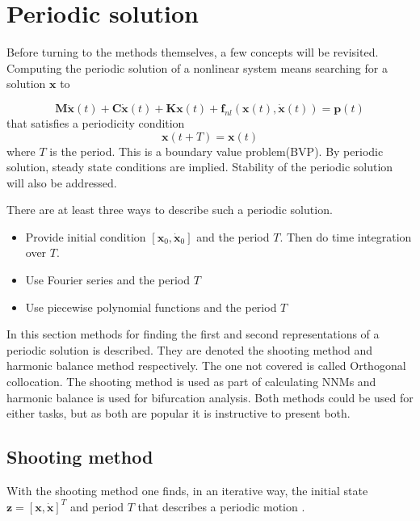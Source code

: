 

\section{Periodic solution}
\label{sec:periodic-solution}

Before turning to the methods themselves, a few concepts will be revisited.
Computing the periodic solution of a nonlinear system means searching for a
solution $\bm x$ to

\begin{equation}
    \label{eq:per_eom}
  \bm M \ddot{\bm x}(t) + \bm C \dot{\bm x}(t) + \bm K \bm x(t) +
  \bm f_{nl} \left( \bm x(t), \dot{ \bm x}(t) \right) = \bm p (t)
\end{equation}
that satisfies a periodicity condition
\begin{equation}
  \label{eq:per_condtion}
  \bm x(t+T) = \bm x(t)
\end{equation}
where $T$ is the period. This is a boundary value problem(BVP). By periodic
solution, steady state conditions are implied. Stability of the periodic
solution will also be addressed.


There are at least three ways to describe such a periodic solution.

\begin{itemize}
\item Provide initial condition $\left[\bm x_0, \dot{\bm x}_0 \right]$ and the
  period $T$. Then do time integration over $T$.
\item Use Fourier series and the period $T$
\item Use piecewise polynomial functions and the period $T$
\end{itemize}

In this section methods for finding the first and second representations of a
periodic solution is described. They are denoted the shooting method and
harmonic balance method respectively. The one not covered is called
Orthogonal collocation. The shooting method is used as part of calculating NNMs
and harmonic balance is used for bifurcation analysis. Both methods could be
used for either tasks, but as both are popular it is instructive to present
both.

\subsection{Shooting method}
\label{sec:shooting_method}

With the shooting method one finds, in an iterative way, the initial state $\bm
z = [\bm x, \dot{\bm x}]^T$ and period $T$ that describes a periodic
motion \autocite{nayfeh2008applied}.

